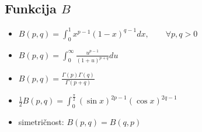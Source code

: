\begin{multicols}{5}
\subsection*{Funkcija $B$}
\begin{itemize}
    \item $B(p,q) = \int_0^1 x^{p-1} (1-x)^{q-1} dx, \qquad \forall p,q > 0$
    \item $\displaystyle B(p,q) = \int_0^{\infty} \frac{u^{p-1}}{(1+u)^{p+q}}du $
    \item $\displaystyle B(p,q) = \frac{\Gamma(p) \Gamma(q)}{\Gamma(p+q)}$
    \item $\frac{1}{2} B(p,q) = \displaystyle \int_0^{\frac{\pi}{2}} (\sin x)^{2p-1} (\cos x)^{2q-1}$
    \item simetričnost: $B(p,q) = B(q,p)$
\end{itemize}

\end{multicols}
